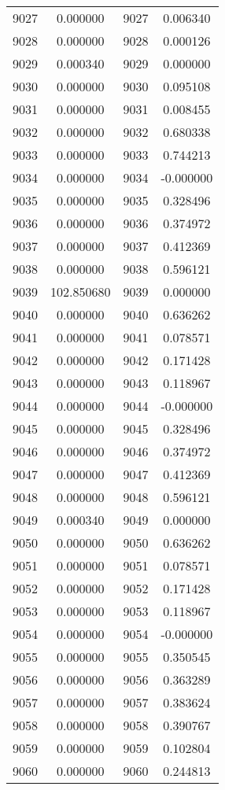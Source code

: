 \documentclass[12pt]{article}
\begin{document}
\begin{longtable}{@{}cccc@{}}
9027 & 0.000000 & 9027 & 0.006340 \\
9028 & 0.000000 & 9028 & 0.000126 \\
9029 & 0.000340 & 9029 & 0.000000 \\
9030 & 0.000000 & 9030 & 0.095108 \\
9031 & 0.000000 & 9031 & 0.008455 \\
9032 & 0.000000 & 9032 & 0.680338 \\
9033 & 0.000000 & 9033 & 0.744213 \\
9034 & 0.000000 & 9034 & -0.000000 \\
9035 & 0.000000 & 9035 & 0.328496 \\
9036 & 0.000000 & 9036 & 0.374972 \\
9037 & 0.000000 & 9037 & 0.412369 \\
9038 & 0.000000 & 9038 & 0.596121 \\
9039 & 102.850680 & 9039 & 0.000000 \\
9040 & 0.000000 & 9040 & 0.636262 \\
9041 & 0.000000 & 9041 & 0.078571 \\
9042 & 0.000000 & 9042 & 0.171428 \\
9043 & 0.000000 & 9043 & 0.118967 \\
9044 & 0.000000 & 9044 & -0.000000 \\
9045 & 0.000000 & 9045 & 0.328496 \\
9046 & 0.000000 & 9046 & 0.374972 \\
9047 & 0.000000 & 9047 & 0.412369 \\
9048 & 0.000000 & 9048 & 0.596121 \\
9049 & 0.000340 & 9049 & 0.000000 \\
9050 & 0.000000 & 9050 & 0.636262 \\
9051 & 0.000000 & 9051 & 0.078571 \\
9052 & 0.000000 & 9052 & 0.171428 \\
9053 & 0.000000 & 9053 & 0.118967 \\
9054 & 0.000000 & 9054 & -0.000000 \\
9055 & 0.000000 & 9055 & 0.350545 \\
9056 & 0.000000 & 9056 & 0.363289 \\
9057 & 0.000000 & 9057 & 0.383624 \\
9058 & 0.000000 & 9058 & 0.390767 \\
9059 & 0.000000 & 9059 & 0.102804 \\
9060 & 0.000000 & 9060 & 0.244813 \\

\end{longtable}
\end{document}
